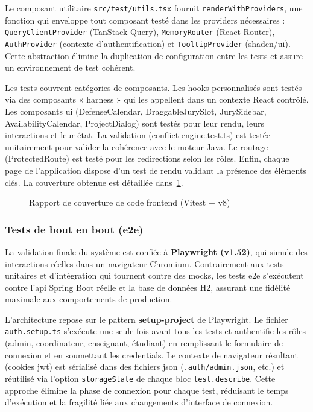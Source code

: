 Le composant utilitaire \texttt{src/test/utils.tsx} fournit \texttt{renderWithProviders}, une fonction qui enveloppe tout composant testé dans les providers nécessaires : \texttt{QueryClientProvider} (TanStack Query), \texttt{MemoryRouter} (React Router), \texttt{AuthProvider} (contexte d'authentification) et \texttt{TooltipProvider} (shadcn/ui). Cette abstraction élimine la duplication de configuration entre les tests et assure un environnement de test cohérent.

Les tests couvrent  catégories de composants. Les hooks personnalisés sont testés via des composants « harness » qui les appellent dans un contexte React contrôlé. Les composants \acrshort{ui} (DefenseCalendar, DraggableJurySlot, JurySidebar, AvailabilityCalendar, ProjectDialog) sont testés pour leur rendu, leurs interactions et leur état. La validation (conflict-engine.test.ts) est testée unitairement pour valider la cohérence avec le moteur Java. Le routage (ProtectedRoute) est testé pour les redirections selon les rôles. Enfin, chaque page de l'application dispose d'un test de rendu validant la présence des éléments clés. La couverture obtenue est détaillée dans~\cref{fig:ui-coverage}.

\begin{figure}[H]
    \caption{Rapport de couverture de code frontend (Vitest + v8)}
    \label{fig:ui-coverage}
\end{figure}

\subsubsection{Tests de bout en bout (\acrshort{e2e})}
\label{ch5:e2e_tests}

La validation finale du système est confiée à \textbf{Playwright (v1.52)}, qui simule des interactions réelles dans un navigateur Chromium. Contrairement aux tests unitaires et d'intégration qui tournent contre des mocks, les tests \acrshort{e2e} s'exécutent contre l'\acrshort{api} Spring Boot réelle et la base de données H2, assurant une fidélité maximale aux comportements de production.

L'architecture repose sur le pattern \textbf{setup-project} de Playwright. Le fichier \texttt{auth.setup.ts} s'exécute une seule fois avant tous les tests et authentifie les  rôles (admin, coordinateur, enseignant, étudiant) en remplissant le formulaire de connexion et en soumettant les credentials. Le contexte de navigateur résultant (cookies \acrshort{jwt}) est sérialisé dans des fichiers \acrshort{json} (\texttt{.auth/admin.json}, etc.) et réutilisé via l'option \texttt{storageState} de chaque bloc \texttt{test.describe}. Cette approche élimine la phase de connexion pour chaque test, réduisant le temps d'exécution et la fragilité liée aux changements d'interface de connexion.

